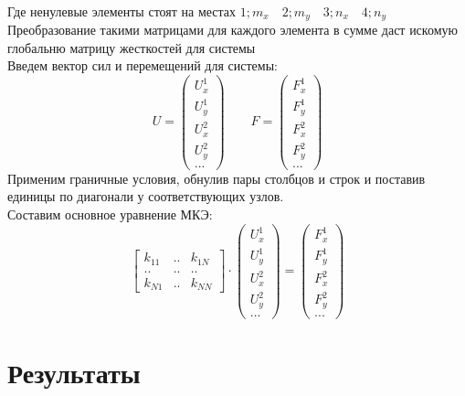 \documentclass[12pt,a4paper]{article}
\begin{document}
	\\
	Где ненулевые элементы стоят на местах $1;m_x \quad 2;m_y \quad 3;n_x  \quad 4;n_y$
	Преобразование такими матрицами для каждого элемента в сумме даст искомую глобальню матрицу жесткостей для системы\\
	Введем вектор сил и перемещений для системы:
	\begin{equation*}
		U=
		\begin{pmatrix}
			U_x^1 \\
			U_y^1 \\
			U_x^2\\
			U_y^2\\
			...
		\end{pmatrix}
	\qquad
	 	F=
	 	\begin{pmatrix}
	 		F_x^1 \\
	 		F_y^1 \\
	 		F_x^2\\
	 		F_y^2\\
	 		...
	 	\end{pmatrix}
	\end{equation*}
	Применим граничные условия, обнулив пары столбцов и строк и поставив единицы по диагонали у соответствующих узлов.\\
	Составим основное уравнение МКЭ:
	\begin{equation*}
		\begin{bmatrix}
			k_{11} &..&k_{1N}\\
			..&..&..\\
			k_{N1}&..&k_{NN}
		\end{bmatrix} \cdot
		\begin{pmatrix}
			U_x^1 \\
			U_y^1 \\
			U_x^2\\
			U_y^2\\
			...
		\end{pmatrix}=
		\begin{pmatrix}
			F_x^1 \\
			F_y^1 \\
			F_x^2\\
			F_y^2\\
			...
		\end{pmatrix}
	\end{equation*}
	\section{Результаты}
\end{document}
